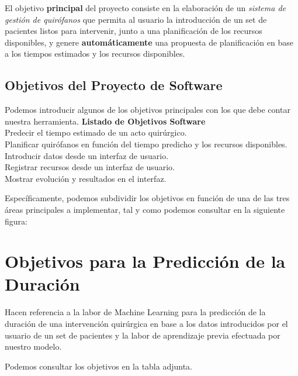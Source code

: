 
El objetivo \textbf{principal} del proyecto consiste en la elaboración de un \textit{sistema de gestión de quirófanos} que permita al usuario la introducción de un set de pacientes listos para intervenir, junto a una planificación de los recursos disponibles, y genere \textbf{automáticamente} una propuesta de planificación en base a los tiempos estimados y los recursos disponibles.

\subsection{Objetivos del Proyecto de Software}
Podemos introducir algunos de los objetivos principales con los que debe contar nuestra herramienta.
{\textbf{Listado de Objetivos Software}\\}{ 
 Predecir el tiempo estimado de un acto quirúrgico. \\ 
 Planificar quirófanos en función del tiempo predicho y los recursos disponibles. \\ 
 Introducir datos desde un interfaz de usuario. \\
 Registrar recursos desde un interfaz de usuario.\\
 Mostrar evolución y resultados en el interfaz. \\ 
 } 

Específicamente, podemos subdividir los objetivos en función de una de las tres áreas principales a implementar, tal y como podemos consultar en la siguiente figura:


\newpage

\section{Objetivos para la Predicción de la Duración}

Hacen referencia a la labor de Machine Learning para la predicción de la duración de una intervención quirúrgica en base a los datos introducidos por el usuario de un set de pacientes y la labor de aprendizaje previa efectuada por nuestro modelo.

Podemos consultar los objetivos en la tabla adjunta.

